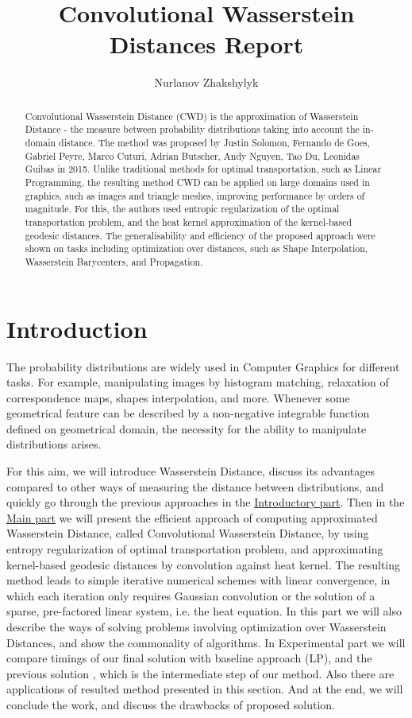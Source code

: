 \documentclass[a4paper,10pt]{article}
\title{Convolutional Wasserstein Distances Report} %
\author{Nurlanov Zhakshylyk} %
\institute{Informatics - Technische Universit\"{a}t M\"{u}nchen} %
\begin{document}
\maketitle

\begin{abstract}

Convolutional Wasserstein Distance (CWD) is the approximation of Wasserstein Distance - the measure between probability distributions taking into account the in-domain distance. The method was proposed by Justin Solomon, Fernando de Goes, Gabriel Peyre, Marco Cuturi, Adrian Butscher, Andy Nguyen, Tao Du, Leonidas Guibas in 2015. Unlike traditional methods for optimal transportation, such as Linear Programming, the resulting method CWD can be applied on large domains used in graphics, such as images and triangle meshes, improving performance by orders of magnitude. For this, the authors used entropic regularization of the optimal transportation problem, and the heat kernel approximation of the kernel-based geodesic distances. The generalisability and efficiency of the proposed approach were shown on tasks including optimization over distances, such as Shape Interpolation, Wasserstein Barycenters, and Propagation. 

\end{abstract}

\section{Introduction}
\label{intro}
The probability distributions are widely used in Computer Graphics for different tasks. For example, manipulating images by histogram matching, relaxation of correspondence maps, shapes interpolation, and more. Whenever some geometrical feature can be described by a non-negative integrable function defined on geometrical domain, the necessity for the ability to manipulate distributions arises.

For this aim, we will introduce Wasserstein Distance, discuss its advantages compared to other ways of measuring the distance between distributions, and quickly go through the previous approaches in the \hyperref[intro]{Introductory part}. Then in the \hyperref[main]{Main part} we will present the efficient approach of computing approximated Wasserstein Distance, called Convolutional Wasserstein Distance, by using entropy regularization of optimal transportation problem, and approximating kernel-based geodesic distances by convolution against heat kernel. The resulting method leads to simple iterative numerical schemes with linear convergence, in which each iteration only requires Gaussian convolution or the solution
of a sparse, pre-factored linear system, i.e. the heat equation. In this part we will also describe the ways of solving problems involving optimization over Wasserstein Distances, and show the commonality of algorithms. In Experimental part we will compare timings of our final solution with baseline approach (LP), and the previous solution \cite{SinkhornDistances}, which is the intermediate step of our method. Also there are applications of resulted method presented in this section. And at the end, we will conclude the work, and discuss the drawbacks of proposed solution.
\end{document}

